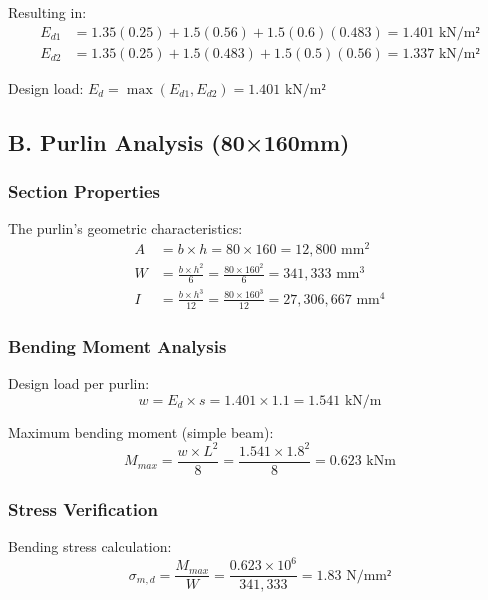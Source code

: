 \documentclass[12pt,a4paper]{article}
\begin{document}
Resulting in:
\begin{equation}
\begin{aligned}
E_{d1} &= 1.35(0.25) + 1.5(0.56) + 1.5(0.6)(0.483) = 1.401 \text{ kN/m²} \\
E_{d2} &= 1.35(0.25) + 1.5(0.483) + 1.5(0.5)(0.56) = 1.337 \text{ kN/m²}
\end{aligned}
\end{equation}

Design load: $E_d = \max(E_{d1}, E_{d2}) = 1.401 \text{ kN/m²}$

\subsection{B. Purlin Analysis (80×160mm)}
\subsubsection{Section Properties}
The purlin's geometric characteristics:
\begin{equation}
\begin{aligned}
A &= b \times h = 80 \times 160 = 12,800 \text{ mm}^2 \\
W &= \frac{b \times h^2}{6} = \frac{80 \times 160^2}{6} = 341,333 \text{ mm}^3 \\
I &= \frac{b \times h^3}{12} = \frac{80 \times 160^3}{12} = 27,306,667 \text{ mm}^4
\end{aligned}
\end{equation}

\subsubsection{Bending Moment Analysis}
Design load per purlin:
\begin{equation}
w = E_d \times s = 1.401 \times 1.1 = 1.541 \text{ kN/m}
\end{equation}

Maximum bending moment (simple beam):
\begin{equation}
M_{max} = \frac{w \times L^2}{8} = \frac{1.541 \times 1.8^2}{8} = 0.623 \text{ kNm}
\end{equation}

\subsubsection{Stress Verification}
Bending stress calculation:
\begin{equation}
\sigma_{m,d} = \frac{M_{max}}{W} = \frac{0.623 \times 10^6}{341,333} = 1.83 \text{ N/mm²}
\end{equation}
\end{document}
